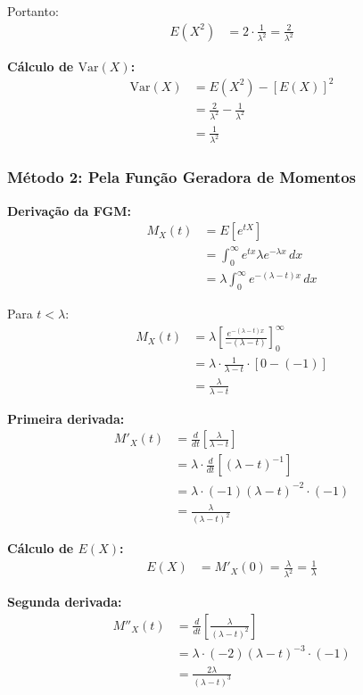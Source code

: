 \documentclass[12pt,a4paper]{article}
\theoremstyle{plain}
\theoremstyle{definition}
\theoremstyle{remark}
\begin{document}
Portanto:
\begin{align}
E(X^2) &= 2 \cdot \frac{1}{\lambda^2} = \frac{2}{\lambda^2}
\end{align}

\textbf{Cálculo de \(\text{Var}(X)\):}
\begin{align}
\text{Var}(X) &= E(X^2) - [E(X)]^2 \\
&= \frac{2}{\lambda^2} - \frac{1}{\lambda^2} \\
&= \frac{1}{\lambda^2}
\end{align}

\subsubsection{Método 2: Pela Função Geradora de Momentos}

\textbf{Derivação da FGM:}
\begin{align}
M_X(t) &= E[e^{tX}] \\
&= \int_0^{\infty} e^{tx} \lambda e^{-\lambda x} \, dx \\
&= \lambda \int_0^{\infty} e^{-(\lambda - t)x} \, dx
\end{align}

Para \(t < \lambda\):
\begin{align}
M_X(t) &= \lambda \left[ \frac{e^{-(\lambda-t)x}}{-(\lambda-t)} \right]_0^{\infty} \\
&= \lambda \cdot \frac{1}{\lambda - t} \cdot \left[ 0 - (-1) \right] \\
&= \frac{\lambda}{\lambda - t}
\end{align}

\textbf{Primeira derivada:}
\begin{align}
M'_X(t) &= \frac{d}{dt}\left[\frac{\lambda}{\lambda - t}\right] \\
&= \lambda \cdot \frac{d}{dt}[(\lambda - t)^{-1}] \\
&= \lambda \cdot (-1)(\lambda - t)^{-2} \cdot (-1) \\
&= \frac{\lambda}{(\lambda - t)^2}
\end{align}

\textbf{Cálculo de \(E(X)\):}
\begin{align}
E(X) &= M'_X(0) = \frac{\lambda}{\lambda^2} = \frac{1}{\lambda}
\end{align}

\textbf{Segunda derivada:}
\begin{align}
M''_X(t) &= \frac{d}{dt}\left[\frac{\lambda}{(\lambda - t)^2}\right] \\
&= \lambda \cdot (-2)(\lambda - t)^{-3} \cdot (-1) \\
&= \frac{2\lambda}{(\lambda - t)^3}
\end{align}
\end{document}
